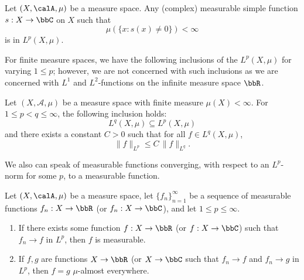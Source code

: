 \begin{lemma} \label{lemma:compactly_supported_simple_measurable_functoins_are_in_L_p}
    Let $(X,\calA, \mu)$ be a measure space. Any (complex) measurable simple function $s: X \to \bbC$ on $X$ such that $$ \mu(\{x: s(x) \neq 0\})<\infty$$ is in $L^p(X, \mu)$. 
\end{lemma}

For finite measure spaces, we have the following inclusions of the $L^p(X,\mu)$ for varying $1 \leq p$; however, we are not concerned with such inclusions as we are concerned with $L^1$ and $L^2$-functions on the infinite measure space $\bbR$. 

\begin{proposition}
    Let \((X, \mathcal{A}, \mu)\) be a measure space with finite measure \( \mu(X) < \infty \). For \(1 \leq p < q \leq \infty\), the following inclusion holds:
    \[
    L^q(X, \mu) \subseteq L^p(X, \mu)
    \]
    and there exists a constant \(C > 0\) such that for all \(f \in L^q(X, \mu)\),
    \[
    \|f\|_{L^p} \leq C \, \|f\|_{L^q}.
    \]
\end{proposition}

We also can speak of measurable functions converging, with respect to an $L^p$-norm for some $p$, to a measurable function.



\begin{lemma}
    Let $(X,\calA,\mu)$ be a measure space, let $\{f_n\}_{n=1}^\infty$ be a sequence of measurable functions $f_n: X \to \bbR$ (or $f_n: X \to \bbC$), and let $1 \leq p \leq \infty$. 
    \begin{enumerate}
        \item If there exists some function $f: X \to \bbR$ (or $f: X \to \bbC$) such that $f_n \to f$ in $L^p$, then $f$ is measurable.
        \item If $f,g$ are functions $X \to \bbR$ (or $X \to \bbC$ such that $f_n \to f$ and $f_n \to g$ in $L^p$, then $f = g$ $\mu$-almost everywhere.
    \end{enumerate}
\end{lemma}



